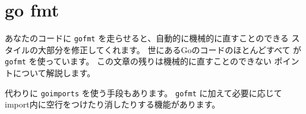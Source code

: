\section{go fmt}

あなたのコードに \texttt{gofmt} を走らせると、自動的に機械的に直すことのできる
スタイルの大部分を修正してくれます。 世にあるGoのコードのほとんどすべて
が \texttt{gofmt} を使っています。 この文章の残りは機械的に直すことのできない
ポイントについて解説します。

代わりに \texttt{goimports} を使う手段もあります。 
\texttt{gofmt} に加えて必要に応じてimport内に空行をつけたり消したりする機能があります。
